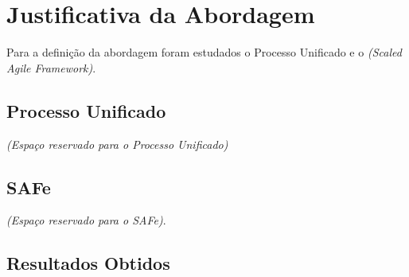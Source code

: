 \section{Justificativa da Abordagem}
	\setlength{\parindent}{10ex}
	Para a definição da abordagem foram estudados o Processo Unificado e o \textit{(Scaled Agile Framework)}.

	\subsection{Processo Unificado}
	\textit{(Espaço reservado para o Processo Unificado)}
	\subsection{SAFe}
	\textit{(Espaço reservado para o SAFe)}.
	\subsection{Resultados Obtidos}

